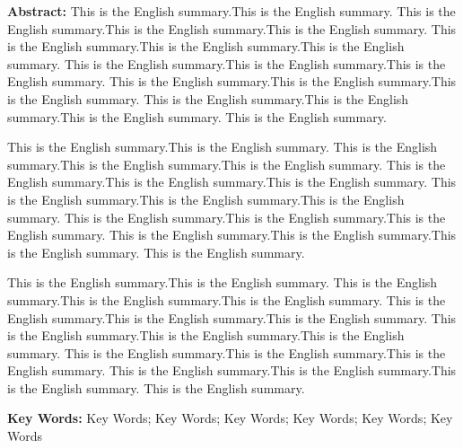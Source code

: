 \noindent\textbf{Abstract: }This is the English summary.This is the English summary. This is the English summary.This is the English summary.This is the English summary. This is the English summary.This is the English summary.This is the English summary. This is the English summary.This is the English summary.This is the English summary. This is the English summary.This is the English summary.This is the English summary. This is the English summary.This is the English summary.This is the English summary. This is the English summary.



This is the English summary.This is the English summary. This is the English summary.This is the English summary.This is the English summary. This is the English summary.This is the English summary.This is the English summary. This is the English summary.This is the English summary.This is the English summary. This is the English summary.This is the English summary.This is the English summary. This is the English summary.This is the English summary.This is the English summary. This is the English summary.


This is the English summary.This is the English summary. This is the English summary.This is the English summary.This is the English summary. This is the English summary.This is the English summary.This is the English summary. This is the English summary.This is the English summary.This is the English summary. This is the English summary.This is the English summary.This is the English summary. This is the English summary.This is the English summary.This is the English summary. This is the English summary.

\vspace{1em}
\noindent\textbf{Key Words: }Key Words; Key Words; Key Words; Key Words; Key Words; Key Words